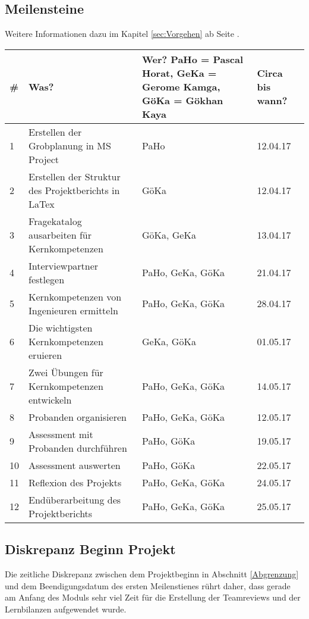 \subsection{Meilensteine}
Weitere Informationen dazu im Kapitel \ref{sec:Vorgehen} ab Seite \pageref{sec:Vorgehen}.\\

\begin{tabular}{ | p{0.3cm} | p{7.7cm} | p{4.3cm} | p{1.3cm} |}
    \hline
    \textbf{\#} & \textbf{Was?} & \textbf{Wer?} PaHo = Pascal Horat, GeKa = Gerome Kamga, GöKa = Gökhan Kaya & \textbf{Circa bis wann?} \\ \hline
    1 & Erstellen der Grobplanung in MS Project & PaHo & 12.04.17 \\ \hline
    2 & Erstellen der Struktur des Projektberichts in LaTex & GöKa & 12.04.17 \\ \hline
    3 & Fragekatalog ausarbeiten für Kernkompetenzen & GöKa, GeKa & 13.04.17 \\ \hline
    4 & Interviewpartner festlegen & PaHo, GeKa, GöKa & 21.04.17 \\ \hline
    5 & Kernkompetenzen von Ingenieuren ermitteln & PaHo, GeKa, GöKa & 28.04.17 \\ \hline
    6 & Die wichtigsten Kernkompetenzen eruieren & GeKa, GöKa & 01.05.17 \\ \hline
    7 & Zwei Übungen für Kernkompetenzen entwickeln & PaHo, GeKa, GöKa & 14.05.17 \\ \hline
    8 & Probanden organisieren & PaHo, GeKa, GöKa & 12.05.17 \\ \hline
    9 & Assessment mit Probanden durchführen & PaHo, GöKa & 19.05.17 \\ \hline
    10 & Assessment auswerten & PaHo, GöKa & 22.05.17 \\ \hline
    11 & Reflexion des Projekts & PaHo, GeKa, GöKa & 24.05.17 \\ \hline
    12 & Endüberarbeitung des Projektberichts & PaHo, GeKa, GöKa & 25.05.17 \\ \hline 
\end{tabular} 

\subsection{Diskrepanz Beginn Projekt}
Die zeitliche Diskrepanz zwischen dem Projektbeginn in Abschnitt \ref{Abgrenzung} und dem Beendigungsdatum des ersten Meilenstienes rührt daher, dass gerade am Anfang des Moduls sehr viel Zeit für die Erstellung der Teamreviews und der Lernbilanzen aufgewendet wurde.

